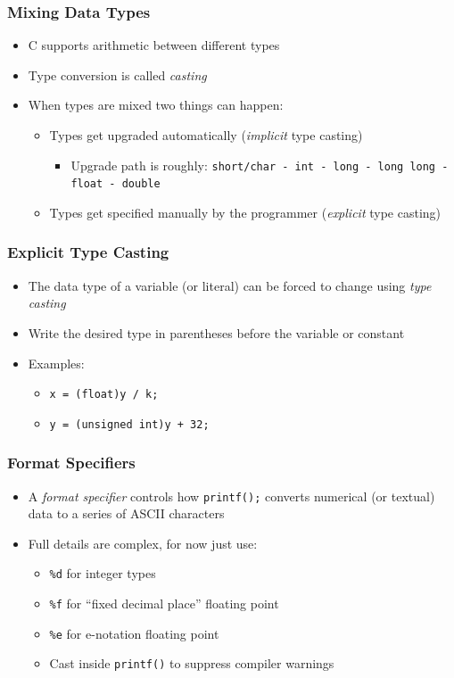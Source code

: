 \documentclass[14pt]{beamer}
\begin{document}
\begin{frame}
\frametitle{Mixing Data Types}
\begin{itemize}
\item C supports arithmetic between different types
\item Type conversion is called \textit{casting}
\item When types are mixed two things can happen:
	\begin{itemize}
		\item Types get upgraded automatically (\textit{implicit} type casting)
			\begin{itemize}
				\item Upgrade path is roughly: \texttt{short/char - int - long - long long - float - double}
			\end{itemize}
		\item Types get specified manually by the programmer (\textit{explicit} type casting)
	\end{itemize}
\end{itemize}
\end{frame}

\begin{frame}
\frametitle{Explicit Type Casting}
\begin{itemize}
\item The data type of a variable (or literal) can be forced to change using \textit{type casting}
\item Write the desired type in parentheses before the variable or constant
\item Examples:
	\begin{itemize}
		\item \texttt{x = (float)y / k;}
		\item \texttt{y = (unsigned int)y + 32;}
	\end{itemize}
\end{itemize}
\end{frame}

\begin{frame}
\frametitle{Format Specifiers}
\begin{itemize}
\item A \textit{format specifier} controls how \texttt{printf();} converts numerical (or textual) data to a series of ASCII characters
\item Full details are complex, for now just use:
	\begin{itemize}
		\item \texttt{\%d} for integer types
		\item \texttt{\%f} for ``fixed decimal place'' floating point
		\item \texttt{\%e} for e-notation floating point
		\item Cast inside \texttt{printf()} to suppress compiler warnings
	\end{itemize}	 
\end{itemize}
\end{frame}
\end{document}
